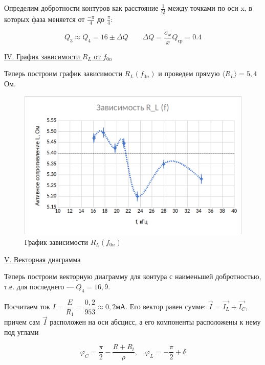 \documentclass{article}
\begin{document}
Определим добротности контуров как расстояние \(\frac{1}{Q}\) между точками по оси x, в которых фаза меняется от \(\frac{-\pi}{4}\) до \(\frac{\pi}{4}\):

\begin{equation}
    Q_{3} \approx Q_{4} = 16 \pm \Delta Q \qquad \Delta Q = \frac{\sigma_{x}}{x} Q_{\text{ср}} = 0.4
\end{equation}

\newpage

\begin{center}
    \underline{\large {\RN{4}. График  зависимости $ R_L $ от $ f_{0n} $}}
\end{center}

Теперь построим график зависимости $ R_L (f_{0n}) $ и проведем прямую $ \langle R_L \rangle = 5,4 $ Ом. 

\begin{figure}[h!]
    \centering
    \includegraphics[width=12cm]{RL(F).png}
   \caption{График зависимости $ R_L (f_{0n}) $}
\end{figure}

\begin{center}
    \underline{\large {\RN{5}. Векторная диаграмма}}
\end{center}

Теперь построим векторную диаграмму для контура с наименьшей добротностью, т.е. для последнего --- $ Q_4= 16,9 $. 

Посчитаем ток $ I = \dfrac{E}{R_1} = \dfrac{0,2}{953} \approx 0,2 мА $. Его вектор равен сумме: $ \vec{I} = \vec{I_L} + \vec{I_C} $, причем сам $ \vec{I} $ расположен на оси абсцисс, а его компоненты расположены к нему под углами

\begin{equation}\label{}
\varphi_C = \dfrac{\pi}{2} - \dfrac{R + R_l}{\rho}, \quad \varphi_L = -\dfrac{\pi}{2} + \delta
\end{equation}
\end{document}
